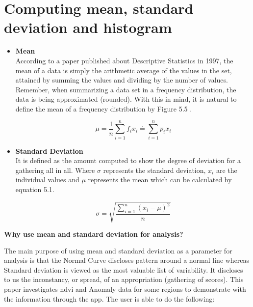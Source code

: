 \newpage

\section{Computing mean, standard deviation and histogram}

\begin{itemize}
    \item \textbf{Mean} \\
    According to a paper published about Descriptive Statistics in 1997, the mean of a data is simply the arithmetic average of the values in the set, attained by summing the values and dividing by the number of values. Remember, when summarizing a data set in a frequency distribution, the data is being approximated (rounded). With this in mind, it is natural to define the mean of a frequency distribution by Figure 5.5 \cite{Mean_SD}.
    
    \begin{equation} \label{eq:mean_formula}
       \mu = \frac{1}{n} \sum\limits_{i=1}^{n}f_{i}x_{i} \doteq \sum\limits_{i=1}^{n}p_{i}x_{i}
    \end{equation}
    
    \item \textbf{Standard Deviation} \\
   It is defined as the amount computed to show the degree of deviation for a gathering all in all. Where $\sigma$ represents the standard deviation, $x_{i}$ are the individual values and $\mu$ represents the mean which can be calculated by equation 5.1.
   
  \begin{equation} \label{eq:standarddeviation_formula}
      \sigma = \sqrt{\frac{\sum\limits_{i=1}^{n}(x_{i} - \mu)^2}{n}}
    \end{equation}
    


    
\end{itemize}

\centerline{\textbf{Why use mean and standard deviation for analysis?}}

The main purpose of using mean and standard deviation as a parameter for analysis is that the Normal Curve discloses pattern around a normal line whereas Standard deviation is viewed as the most valuable list of variability. It discloses to us the inconstancy, or spread, of an appropriation (gathering of scores). This paper investigates \gls{ndvi} and Anomaly data for some regions to demonstrate with the information through the app. The user is able to do the following:

